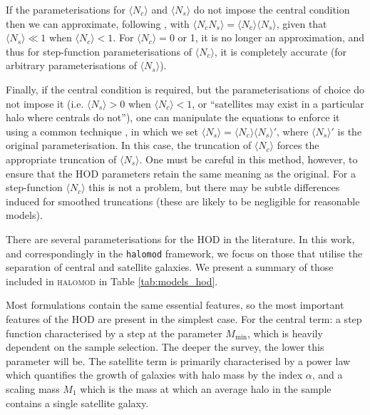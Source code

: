 \documentclass[5p]{elsarticle}
\newcommand{\Nc}{\langle N_c \rangle}
\newcommand{\Ns}{\langle N_s \rangle}
\begin{document}
If the parameterisations for $\Nc$ and $\Ns$ do not impose the central condition then we can approximate, following \citet{Zehavi2005}, with $\langle N_c N_s \rangle = \Nc \Ns$, given that $\Ns \ll 1$ when $\Nc < 1$. For $\Nc = 0$ or 1, it is no longer an approximation, and thus for step-function parameterisations of $\Nc$, it is completely accurate (for arbitrary parameterisations of $\Ns$).

Finally, if the central condition is required, but the parameterisations of choice do not impose it (i.e. $\Ns > 0$ when $\Nc<1$, or ``satellites may exist in a particular halo where centrals do not''), one can manipulate the equations to enforce it using a common technique \citep[eg.][]{Beutler2013}, in which we set $\Ns = \Nc \Ns'$, where $\Ns'$ is the original parameterisation. In this case, the truncation of $\Nc$ forces the appropriate truncation of $\Ns$. One must be careful in this method, however,  to ensure that the HOD parameters retain the same meaning as the original. For a step-function $\Nc$ this is not a problem, but there may be subtle differences induced for smoothed truncations (these are likely to be negligible for reasonable models).

There are several parameterisations for the HOD in the literature. In this work, and correspondingly in the \verb|halomod| framework, we focus on those that utilise the separation of
central and satellite galaxies. We present a summary of those included in \textsc{halomod} in Table \ref{tab:models_hod}. 

 Most formulations contain the same essential features, so the most important features of the HOD are present in the simplest case. For the central term: a step function characterised by a step at the parameter $M_\text{min}$, which is heavily dependent on the sample selection. The deeper the survey, the lower this parameter will be. The satellite term is primarily characterised by a power law which quantifies the growth of galaxies with halo mass by the index $\alpha$, and a scaling mass $M_1$ which is the mass at which an average halo in the sample contains a single satellite galaxy.
\end{document}
